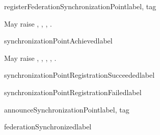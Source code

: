 \begin{methoddesc}{registerFederationSynchronizationPoint}{label, tag}

May raise
,
,
,
.
\end{methoddesc}

\begin{methoddesc}{synchronizationPointAchieved}{label}

May raise
,
,
,
,
.
\end{methoddesc}

\begin{methoddesc}{synchronizationPointRegistrationSucceeded}{label}
\end{methoddesc}

\begin{methoddesc}{synchronizationPointRegistrationFailed}{label}
\end{methoddesc}

\begin{methoddesc}{announceSynchronizationPoint}{label, tag}
\end{methoddesc}

\begin{methoddesc}{federationSynchronized}{label}
\end{methoddesc}

